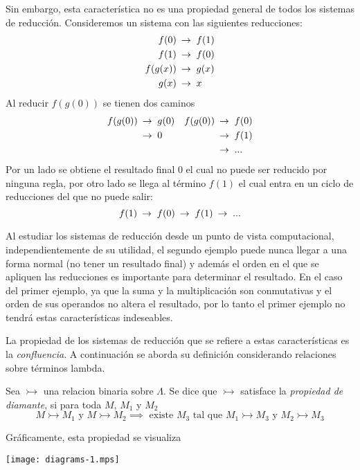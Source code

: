 Sin embargo, esta característica no es una propiedad general de todos los sistemas de reducción. Consideremos un sistema con las siguientes reducciones:
\begin{align*}
  f(0) &\ \operatorname{\rightarrow_{}}\  f(1) \\
  f(1) &\ \operatorname{\rightarrow_{}}\  f(0) \\
  f(g(x)) &\ \operatorname{\rightarrow_{}}\  g(x) \\
  g(x) &\ \operatorname{\rightarrow_{}}\  x
\end{align*}
Al reducir \( f(g(0)) \) se tienen dos caminos
\begin{align*}
  f(g(0)) &\ \operatorname{\rightarrow_{}}\  g(0) & f(g(0)) &\ \operatorname{\rightarrow_{}}\  f(0) \\
          &\ \operatorname{\rightarrow_{}}\  0    &         &\ \operatorname{\rightarrow_{}}\  f(1) \\
  & & &\ \operatorname{\rightarrow_{}}\  ...
\end{align*}
Por un lado se obtiene el resultado final \( 0 \) el cual no puede ser reducido por ninguna regla, por otro lado se llega al término \( f(1) \) el cual entra en un ciclo de reducciones del que no puede salir:
\[ f(1) \ \operatorname{\rightarrow_{}}\  f(0) \ \operatorname{\rightarrow_{}}\  f(1) \ \operatorname{\rightarrow_{}}\  ... \]

Al estudiar los sistemas de reducción desde un punto de vista computacional, independientemente de su utilidad, el segundo ejemplo puede nunca llegar a una forma normal (no tener un resultado final) y además el orden en el que se apliquen las reducciones es importante para determinar el resultado. En el caso del primer ejemplo, ya que la suma y la multiplicación son conmutativas y el orden de sus operandos no altera el resultado, por lo tanto el primer ejemplo no tendrá estas características indeseables.

La propiedad de los sistemas de reducción que se refiere a estas características es la \emph{confluencia}. A continuación se aborda su definición considerando relaciones sobre términos lambda.

\begin{defn}
  Sea \( \rightarrowtail \) una relacion binaria sobre \( Λ \). Se dice que \( \rightarrowtail \) satisface la \emph{propiedad de diamante}, si para toda \( M \), \( M_{1} \) y \( M_{2} \)
  \[ M \rightarrowtail M_{1} \text{ y } M \rightarrowtail M_{2} \implies \text{ existe } M_{3} \text{ tal que } M_{1} \rightarrowtail M_{3} \text{ y } M_{2} \rightarrowtail M_{3} \]

  Gráficamente, esta propiedad se visualiza
  \begin{center}
    \texttt{[image: diagrams-1.mps]}
  \end{center}
\end{defn}

